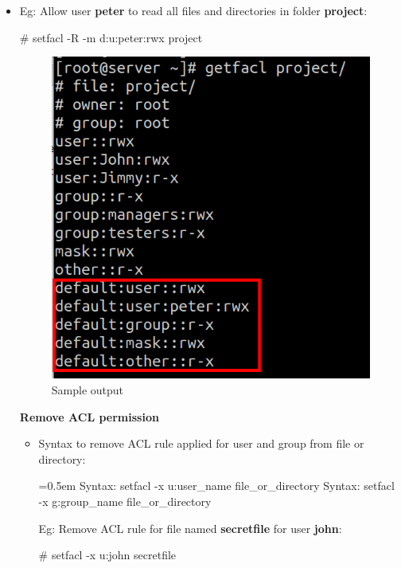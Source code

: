 \begin{flushleft}
\begin{itemize}
	\item Eg: Allow user \textbf{peter} to read all files and directories in folder \textbf{project}:
	\bigskip
	\begin{tcolorbox}[breakable,notitle,boxrule=-0pt,colback=black,colframe=black]
		\color{green}
		\font=9pt
		\# setfacl -R -m d:u:peter:rwx  project
		\font=4pt
	\end{tcolorbox}

	\begin{figure}[h!]
		\centering
		\includegraphics[scale=0.4]{content/chapter6/images/getfacl2.png}
		\caption{Sample output}
		\label{fig:acl_example2}
	\end{figure}
	

\newpage

\textbf{Remove ACL permission}
\bigskip
\begin{itemize}
	\item Syntax to remove ACL rule applied for user and group from file or directory:
	\bigskip
	\begin{tcolorbox}[breakable,notitle,boxrule=-0pt,colback=pink,colframe=pink]
		\color{black}
		\font=0.5em
		Syntax: setfacl -x u:user\_name file\_or\_directory
		\newline
		Syntax: setfacl -x g:group\_name file\_or\_directory
		\font=4pt
	\end{tcolorbox}
	Eg: Remove ACL rule for file named \textbf{secretfile} for user \textbf{john}:
	\begin{tcolorbox}[breakable,notitle,boxrule=-0pt,colback=black,colframe=black]
		\color{green}
		\font=9pt
		\# setfacl -x u:john secretfile
		\font=4pt
	\end{tcolorbox}


\end{itemize}
\end{itemize}
\end{flushleft}
